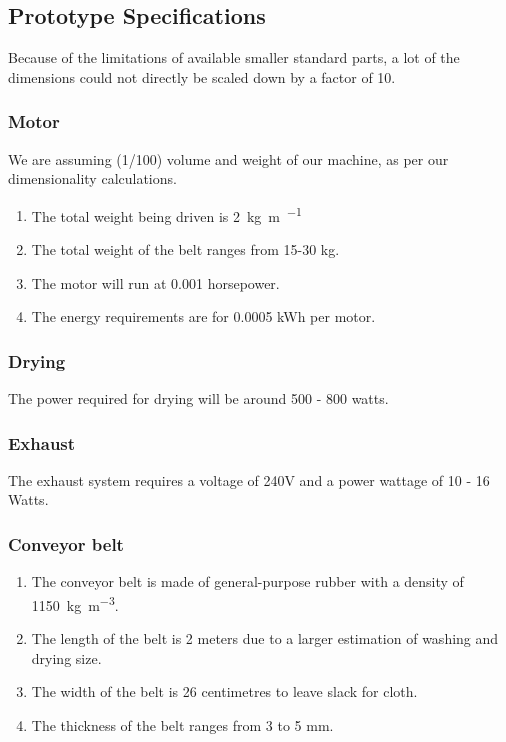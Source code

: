 \documentclass[12pt]{article} %
\begin{document}
\clearpage

\subsection{Prototype Specifications}
Because of the limitations of available smaller standard parts, a lot of the dimensions could not directly be scaled down by a factor of 10.
    
    \subsubsection{Motor}
    We are assuming (1/100) volume and weight of our machine, as per our dimensionality calculations. 
    \begin{enumerate}
    \item The total weight being driven is \SI{2}{\kg\m\per\min}
   \item The total weight of the belt ranges from 15-30 kg.
   \item The motor will run at 0.001 horsepower.
   \item The energy requirements are for 0.0005 kWh per motor.
   \end{enumerate}

   \subsubsection{Drying}
    The power required for drying will be around 500 - 800 watts.
    \subsubsection{Exhaust}
    The exhaust system requires a voltage of 240V and a power wattage of 10 - 16 Watts.

    \subsubsection{Conveyor belt} 
   \begin{enumerate}
   \item The conveyor belt is made of general-purpose rubber with a density of \SI{1150}{\kg\per\cubic\m}.
   \item The length of the belt is 2 meters due to a larger estimation of washing and drying size.
   \item The width of the belt is 26 centimetres to leave slack for cloth.
   \item The thickness of the belt ranges from 3 to 5 mm.
   \end{enumerate}
\end{document}
